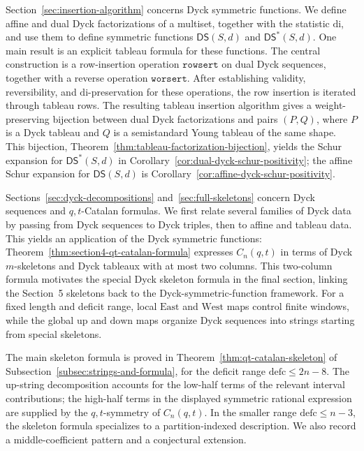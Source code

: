 \documentclass[11pt]{article}
\theoremstyle{plain}
\theoremstyle{definition}
\theoremstyle{remark}
\newcommand{\di}{\mathrm{di}}
\newcommand{\defc}{\mathrm{defc}}
\newcommand{\DS}{\mathsf{DS}}
\newcommand{\DSstar}{\mathsf{DS}^{*}}
\newcommand{\rowsert}{\texttt{rowsert}}
\newcommand{\worsert}{\texttt{worsert}}
\begin{document}
Section~\ref{sec:insertion-algorithm} concerns Dyck symmetric functions.  We
define affine and dual Dyck factorizations of a multiset, together with the
statistic \(\di\), and use them to define symmetric functions \(\DS(S,d)\) and
\(\DSstar(S,d)\).  One main result is an explicit tableau formula for these
functions.  The central construction is a row-insertion operation \(\rowsert\)
on dual Dyck sequences,
together with a reverse operation \(\worsert\).  After establishing validity,
reversibility, and \(\di\)-preservation for these operations, the row insertion
is iterated through tableau rows.  The resulting
tableau insertion algorithm gives a weight-preserving bijection between dual
Dyck factorizations and pairs \((P,Q)\), where \(P\) is a Dyck tableau and
\(Q\) is a semistandard Young tableau of the same shape.  This bijection,
Theorem~\ref{thm:tableau-factorization-bijection}, yields the Schur expansion
for \(\DSstar(S,d)\) in
Corollary~\ref{cor:dual-dyck-schur-positivity}; the affine Schur expansion for
\(\DS(S,d)\) is Corollary~\ref{cor:affine-dyck-schur-positivity}.

Sections~\ref{sec:dyck-decompositions} and~\ref{sec:full-skeletons} concern
Dyck sequences and \(q,t\)-Catalan formulas.  We first relate several families
of Dyck data by passing from Dyck sequences to Dyck triples, then to affine and
tableau data.  This yields an application of the Dyck symmetric functions:
Theorem~\ref{thm:section4-qt-catalan-formula} expresses \(C_n(q,t)\) in terms
of Dyck \(m\)-skeletons and Dyck tableaux with at most two columns.  This
two-column formula motivates the special Dyck skeleton formula in the final
section, linking the Section~5 skeletons back to the Dyck-symmetric-function
framework.  For a
fixed length and deficit range, local \(\mathrm{East}\) and \(\mathrm{West}\)
maps control finite windows, while the global \(\mathrm{up}\) and
\(\mathrm{down}\) maps organize Dyck sequences into strings starting from
special skeletons.

The main skeleton formula is proved in
Theorem~\ref{thm:qt-catalan-skeleton} of
Subsection~\ref{subsec:strings-and-formula}, for the deficit range
\(\defc\le 2n-8\).  The \(\mathrm{up}\)-string decomposition accounts
for the low-half terms of the relevant interval contributions; the high-half
terms in the displayed symmetric rational expression are supplied by the
\(q,t\)-symmetry of \(C_n(q,t)\).  In the smaller range
\(\defc\le n-3\), the skeleton formula specializes to a partition-indexed
description.  We also record a middle-coefficient pattern and a
conjectural extension.
\end{document}
